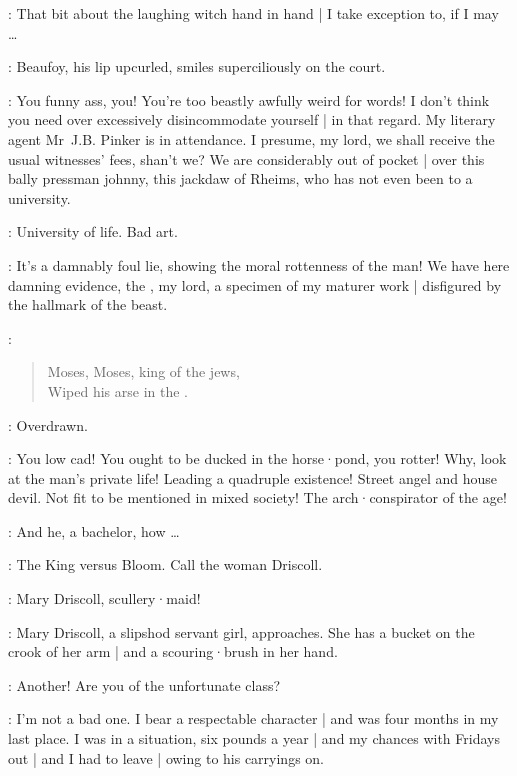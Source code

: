 \Bloom:
That bit about the laughing witch
hand in hand |
I take exception to,
if I may \ldots

:
Beaufoy,
his lip upcurled,
smiles superciliously on the court.

\Beaufoy:
You funny ass,
you!
You're too beastly awfully weird for words!
I don't think you need over excessively disincommodate yourself |
in that regard.
My literary agent Mr~J.B. Pinker is in attendance.
I presume,
my lord,
we shall receive the usual witnesses' fees,
shan't we?
We are considerably out of pocket |
over this bally pressman johnny,
this jackdaw of Rheims,
who has not even been to a university.

\Bloom:
University of life.
Bad art.

\Beaufoy:
It's a damnably foul lie,
showing the moral rottenness of the man!
We have here damning evidence,
the ,
my lord,
a specimen of my maturer work |
disfigured by the hallmark of the beast.

\GalleryVoice:
\begin{verse}
    Moses, Moses, king of the jews,\\
    Wiped his arse in the .
\end{verse}

\Bloom:
Overdrawn.

\Beaufoy:
You low cad!
You ought to be ducked in the horse·pond,
you rotter!
Why,
look at the man's private life!
Leading a quadruple existence!
Street angel and house devil.
Not fit to be mentioned in mixed society!
The arch·conspirator of the age!

\Bloom:
And he,
a bachelor,
how \ldots

\FirstWatch:
The King versus Bloom.
Call the woman Driscoll.

\Crier:
Mary Driscoll,
scullery·maid!

:
Mary Driscoll,
a slipshod servant girl,
approaches.
She has a bucket on the crook of her arm |
and a scouring·brush in her hand.

\SecondWatch:
Another!
Are you of the unfortunate class?

\Driscoll[1]:
I'm not a bad one.
I bear a respectable character |
and was four months in my last place.
I was in a situation,
six pounds a year |
and my chances with Fridays out |
and I had to leave |
owing to his carryings on.

